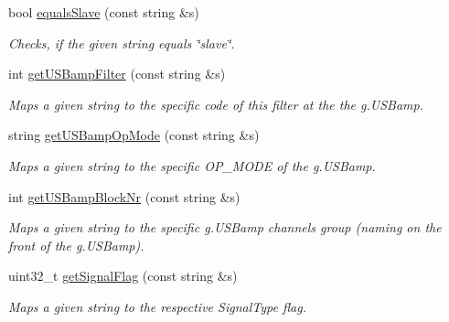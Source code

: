 \begin{DoxyCompactItemize}
bool \hyperlink{class_constants_a55fe8c5ab386f56f6860f9c153800219}{equalsSlave} (const string \&s)
\begin{DoxyCompactList}\small\item\em Checks, if the given string equals \char`\"{}slave\char`\"{}. \item\end{DoxyCompactList}\item 
int \hyperlink{class_constants_a7f9f72585321601ca88ed86ccebdac9f}{getUSBampFilter} (const string \&s)
\begin{DoxyCompactList}\small\item\em Maps a given string to the specific code of this filter at the the g.USBamp. \item\end{DoxyCompactList}\item 
string \hyperlink{class_constants_a33789e205b2169ce7787859db523b0d2}{getUSBampOpMode} (const string \&s)
\begin{DoxyCompactList}\small\item\em Maps a given string to the specific OP\_\-MODE of the g.USBamp. \item\end{DoxyCompactList}\item 
int \hyperlink{class_constants_a1ee954b32810ee811d0f43994c5ca35e}{getUSBampBlockNr} (const string \&s)
\begin{DoxyCompactList}\small\item\em Maps a given string to the specific g.USBamp channels group (naming on the front of the g.USBamp). \item\end{DoxyCompactList}\item 
uint32\_\-t \hyperlink{class_constants_a381d9729953ee019bca64e42d89005e7}{getSignalFlag} (const string \&s)
\begin{DoxyCompactList}\small\item\em Maps a given string to the respective SignalType flag. \item\end{DoxyCompactList}\end{DoxyCompactItemize}
